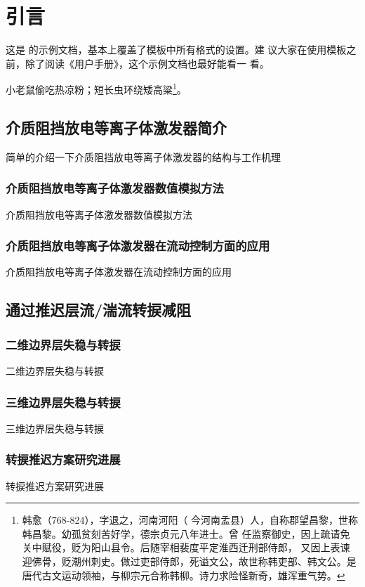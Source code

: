 \chapter{引言}
\label{cha:intro}

这是 \thuthesis\cite{thuthesis} 的示例文档，基本上覆盖了模板中所有格式的设置。建
议大家在使用模板之前，除了阅读《\thuthesis{}用户手册》，这个示例文档也最好能看一
看。

小老鼠偷吃热凉粉；短长虫环绕矮高粱\footnote{韩愈（768-824），字退之，河南河阳（
  今河南孟县）人，自称郡望昌黎，世称韩昌黎。幼孤贫刻苦好学，德宗贞元八年进士。曾
  任监察御史，因上疏请免关中赋役，贬为阳山县令。后随宰相裴度平定淮西迁刑部侍郎，
  又因上表谏迎佛骨，贬潮州刺史。做过吏部侍郎，死谥文公，故世称韩吏部、韩文公。是
  唐代古文运动领袖，与柳宗元合称韩柳。诗力求险怪新奇，雄浑重气势。}。


\section{介质阻挡放电等离子体激发器简介}
简单的介绍一下介质阻挡放电等离子体激发器的结构与工作机理
\subsection{介质阻挡放电等离子体激发器数值模拟方法}
介质阻挡放电等离子体激发器数值模拟方法
\subsection{介质阻挡放电等离子体激发器在流动控制方面的应用}
介质阻挡放电等离子体激发器在流动控制方面的应用
\section{通过推迟层流/湍流转捩减阻}
\label{sec:first}
\subsection{二维边界层失稳与转捩}
二维边界层失稳与转捩
\subsection{三维边界层失稳与转捩}
三维边界层失稳与转捩
\subsection{转捩推迟方案研究进展}
转捩推迟方案研究进展

